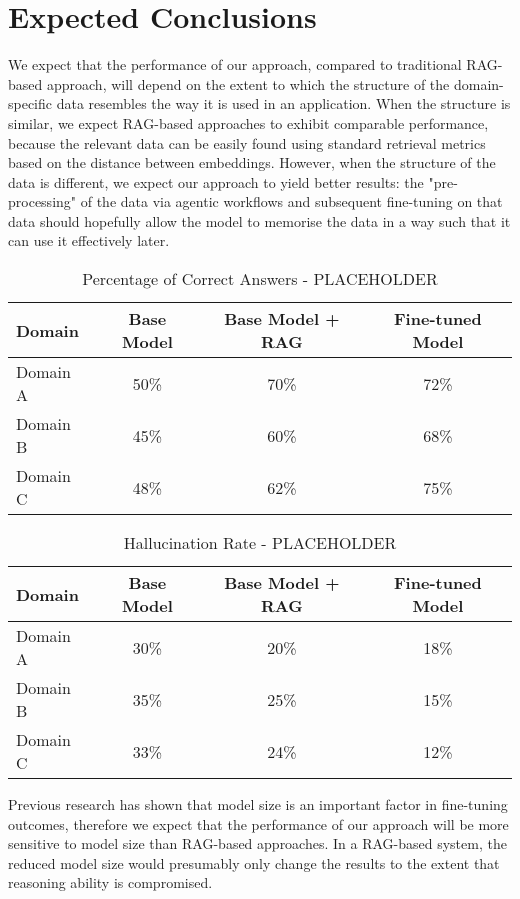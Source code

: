 \section{Expected Conclusions}

We expect that the performance of our approach, compared to traditional
RAG-based approach, will depend on the extent to which the structure of the
domain-specific data resembles the way it is used in an application. When the
structure is similar, we expect RAG-based approaches to exhibit comparable
performance, because the relevant data can be easily found using standard
retrieval metrics based on the distance between embeddings. However, when the
structure of the data is different, we expect our approach to yield better
results: the "pre-processing" of the data via agentic workflows and subsequent
fine-tuning on that data should hopefully allow the model to memorise the data
in a way such that it can use it effectively later.


\begin{table}[ht]
    \centering
    \begin{tabular}{|l|c|c|c|}
        \hline
        \textbf{Domain} & \textbf{Base Model} & \textbf{Base Model + RAG} & \textbf{Fine-tuned Model} \\ \hline
        Domain A & 50\% & 70\% & 72\% \\ \hline
        Domain B & 45\% & 60\% & 68\% \\ \hline
        Domain C & 48\% & 62\% & 75\% \\ \hline
    \end{tabular}
    \caption{Percentage of Correct Answers - PLACEHOLDER}
\end{table}

\begin{table}[ht]
    \centering
    \begin{tabular}{|l|c|c|c|}
        \hline
        \textbf{Domain} & \textbf{Base Model} & \textbf{Base Model + RAG} & \textbf{Fine-tuned Model} \\ \hline
        Domain A & 30\% & 20\% & 18\% \\ \hline
        Domain B & 35\% & 25\% & 15\% \\ \hline
        Domain C & 33\% & 24\% & 12\% \\ \hline
    \end{tabular}
    \caption{Hallucination Rate - PLACEHOLDER}
\end{table}

Previous research \cite{zhang_when_2024} has shown that model size is an
important factor in fine-tuning outcomes, therefore we expect that the
performance of our approach will be more sensitive to model size than RAG-based
approaches. In a RAG-based system, the reduced model size would presumably only
change the results to the extent that reasoning ability is compromised.
